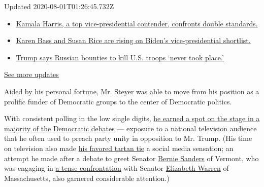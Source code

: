 Updated 2020-08-01T01:26:45.732Z

\begin{itemize}
\tightlist
\item
  \href{https://www.nytimes.com/2020/07/31/us/elections/biden-vs-trump.html?action=click\&pgtype=Article\&state=default\&region=MAIN_CONTENT_1\&context=storylines_live_updates\#link-29fdff45}{Kamala
  Harris, a top vice-presidential contender, confronts double
  standards.}
\item
  \href{https://www.nytimes.com/2020/07/31/us/elections/biden-vs-trump.html?action=click\&pgtype=Article\&state=default\&region=MAIN_CONTENT_1\&context=storylines_live_updates\#link-13ec3d9c}{Karen
  Bass and Susan Rice are rising on Biden's vice-presidential
  shortlist.}
\item
  \href{https://www.nytimes.com/2020/07/31/us/elections/biden-vs-trump.html?action=click\&pgtype=Article\&state=default\&region=MAIN_CONTENT_1\&context=storylines_live_updates\#link-49e9a016}{Trump
  says Russian bounties to kill U.S. troops `never took place.'}
\end{itemize}

\href{https://www.nytimes.com/2020/07/31/us/elections/biden-vs-trump.html?action=click\&pgtype=Article\&state=default\&region=MAIN_CONTENT_1\&context=storylines_live_updates}{See
more updates}

Aided by his personal fortune, Mr. Steyer was able to move from his
position as a prolific funder of Democratic groups to the center of
Democratic politics.

With consistent polling in the low single digits,
\href{https://www.nytimes.com/interactive/2019/us/politics/democratic-debate-lineup.html}{he
earned a spot on the stage in a majority of the Democratic debates} ---
exposure to a national television audience that he often used to preach
party unity in opposition to Mr. Trump. (His time on television also
made
\href{https://www.nytimes.com/2019/10/16/style/tom-steyer-plaid-tie-2020-democratic-debate.html}{his
favored tartan tie} a social media sensation; an attempt he made after a
debate to greet Senator
\href{https://www.nytimes.com/interactive/2020/us/elections/bernie-sanders.html}{Bernie
Sanders} of Vermont, who was engaging in
\href{https://www.nytimes.com/2020/01/15/us/politics/sanders-warren-debate-handshake.html}{a
tense confrontation} with Senator
\href{https://www.nytimes.com/interactive/2020/us/elections/elizabeth-warren.html}{Elizabeth
Warren} of Massachusetts, also garnered considerable attention.)

